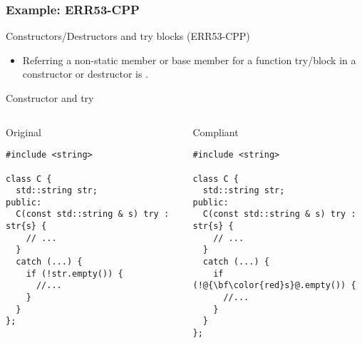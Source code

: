 \subsubsection{Example: ERR53-CPP}

\begin{frame}[t]{Constructors/Destructors and try blocks (ERR53-CPP)}
\begin{itemize}
  \item Referring a non-static member or base member for a function try/block 
        in a constructor or destructor is .
\end{itemize}
\end{frame}

\begin{frame}[t,fragile]{Constructor and try}
\begin{columns}

\begin{block}{Original}
\begin{lstlisting}
#include <string>

class C {
  std::string str;
public:
  C(const std::string & s) try : str{s} {
    // ...
  }
  catch (...) {
    if (!str.empty()) {
      //...
    }
  }
};
\end{lstlisting}
\end{block}

\pause
{}
\begin{block}{Compliant}
\begin{lstlisting}[escapechar=@]
#include <string>

class C {
  std::string str;
public:
  C(const std::string & s) try : str{s} {
    // ...
  }
  catch (...) {
    if (!@{\bf\color{red}s}@.empty()) {
      //...
    }
  }
};
\end{lstlisting}
\end{block}

\end{columns}
\end{frame}

